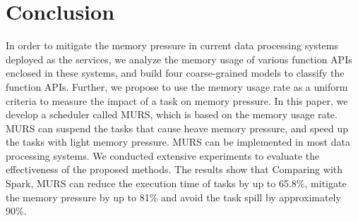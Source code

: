 \section{Conclusion}

In order to mitigate the memory pressure in current data processing systems deployed as the services, we analyze the memory usage of various function APIs enclosed in these systems, and build four coarse-grained models to classify the function APIs. Further, we propose to use the memory usage rate as a uniform criteria to measure the impact of a task on memory pressure. In this paper, we develop a scheduler called MURS, which is based on the memory usage rate. MURS can suspend the tasks that cause heave memory pressure, and speed up the tasks with light memory pressure. MURS can be implemented in most data processing systems. We conducted extensive experiments to evaluate the effectiveness of the proposed methods. The results show that Comparing with Spark, MURS can reduce the execution time of tasks by up to 65.8\%, mitigate the memory pressure by up to 81\% and avoid the task spill by approximately 90\%.